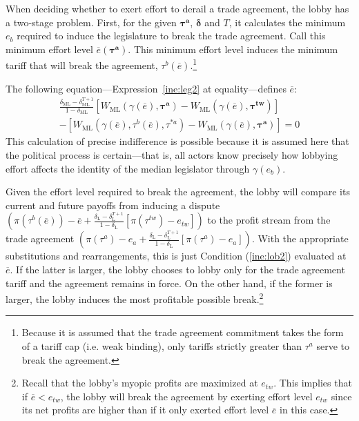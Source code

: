 \documentclass[authoryear, review]{elsarticle}
\newcommand{\ov}{\overline}
\newcommand{\bta}{\bm{\tau^a}}
\newcommand{\ga}{\gamma}
\newcommand{\btw}{\bm{\tau^{tw}}}
\newcommand{\de}{\delta}
\begin{document}
When deciding whether to exert effort to derail a trade agreement, the lobby has a two-stage problem. First, for the given $\bta$, $\bm{\de}$ and $T$, it calculates the minimum $e_b$ required to induce the legislature to break the trade agreement. Call this minimum effort level $\ov{e}(\bta)$. This minimum effort level induces the minimum tariff that will break the agreement, $\tau^b(\ov{e})$.\footnote{Because it is assumed that the trade agreement commitment takes the form of a tariff cap (i.e. weak binding), only tariffs strictly greater than $\tau^a$ serve to break the agreement.}

The following equation---Expression~\ref{ine:leg2} at equality---defines $\ov{e}$:
\begin{multline}
  \frac{\de_\text{ML} - \de_\text{ML}^{T+1}}{1-\de_\text{ML}} \left[W_\text{ML}(\ga(\ov{e}),\bta) - W_\text{ML}(\ga(\ov{e}),\btw) \right] \\
	- \left[ W_\text{ML}(\ga(\ov{e}),\tau^b(\ov{e}),\tau^{*a}) - W_\text{ML}(\ga(\ov{e}),\bta) \right] = 0
  \label{eq:leg2}
\end{multline}
This calculation of precise indifference is possible because it is assumed here that the political process is certain---that is, all actors know precisely how lobbying effort affects the identity of the median legislator through $\ga(e_b)$.

Given the effort level required to break the agreement, the lobby will compare its current and future payoffs from inducing a dispute $\left(\pi(\tau^b(\ov{e})) - \ov{e} + \frac{\de_\text{L} - \de_\text{L}^{T+1}}{1-\de_\text{L}} \left[\pi(\tau^{tw}) -e_{tw}\right] \right)$ to the profit stream from the trade agreement $\left(\pi(\tau^a) - e_a + \frac{\de_\text{L} - \de_\text{L}^{T+1}}{1-\de_\text{L}} \left[\pi(\tau^a) -e_a\right] \right)$. With the appropriate substitutions and rearrangements, this is just Condition (\ref{ine:lob2}) evaluated at $\ov{e}$. If the latter is larger, the lobby chooses to lobby only for the trade agreement tariff and the agreement remains in force. On the other hand, if the former is larger, the lobby induces the most profitable possible break.\footnote{Recall that the lobby's myopic profits are maximized at $e_{tw}$. This implies that if $\ov{e} < e_{tw}$, the lobby will break the agreement by exerting effort level $e_{tw}$ since its net profits are higher than if it only exerted effort level $\ov{e}$ in this case.} 
\end{document}
